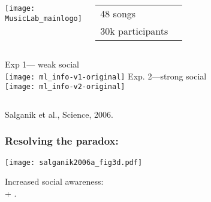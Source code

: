 \begin{frame}

  \begin{columns}
    \texttt{[image: MusicLab\_mainlogo]}%
    \begin{tabular}{ll}
      48 songs \\
      30k participants\\    %
    \end{tabular}
  \end{columns}

  \medskip

  \begin{columns}
    Exp 1--- weak social \\
    \texttt{[image: ml\_info-v1-original]} 
    Exp. 2---strong social\\
    \texttt{[image: ml\_info-v2-original]} 
  \end{columns}


    \medskip
    {\small
      \cite{salganik2006a}
      Salganik et al., Science, 2006.
    }

\end{frame}

\begin{frame}
  \frametitle{Resolving the paradox:}

  \begin{center}
    \texttt{[image: salganik2006a\_fig3d.pdf]}
  \end{center}

  {\Large
    Increased social awareness: \\
     + .
  }
\end{frame}

